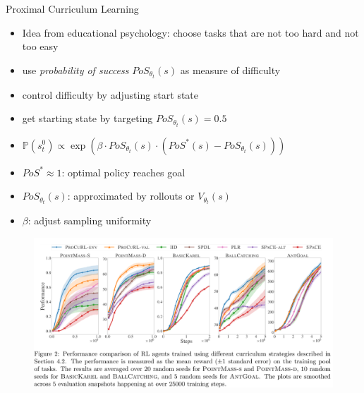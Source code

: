 \documentclass[12pt]{beamer}
\begin{document}
\begin{frame}{Proximal Curriculum Learning \parencite{proximal}}
  \begin{itemize}
    \item Idea from educational psychology: choose tasks that are not too hard and not too easy \parencite{zpd}
    \item use \textit{probability of success} $PoS_{\theta_t}(s)$ as measure of difficulty
    \item control difficulty by adjusting start state
    \item get starting state by targeting $PoS_{\theta_t}(s) = 0.5$
  \end{itemize}
\end{frame}

\begin{frame}
  \begin{itemize}
    \item $ \mathbb{P}(s_t^0) \propto \exp(\beta \cdot PoS_{\theta_t}(s) \cdot (PoS^*(s) - PoS_{\theta_t}(s)))$
    \item $PoS^* \approx 1$: optimal policy reaches goal
    \item $PoS_{\theta_t}(s)$: approximated by rollouts or $V_{\theta_t}(s)$
    \item $\beta$: adjust sampling uniformity
  \end{itemize}
  \pause
  \begin{figure}
    \includegraphics[width=\textwidth, height=\textheight, keepaspectratio]{./experiments.png}
    \centering
  \end{figure}
\end{frame}
\end{document}
